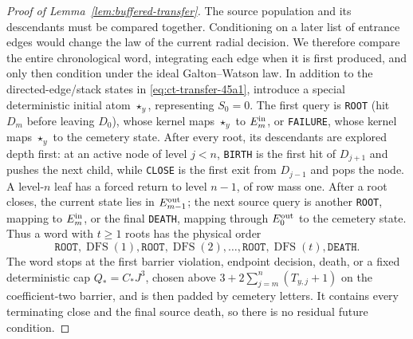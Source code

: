 \begin{proof}[Proof of Lemma~\ref{lem:buffered-transfer}]
The source population and its descendants must be compared together.
Conditioning on a later list of entrance edges would change the law of the
current radial decision.  We therefore compare the entire chronological
word, integrating each edge when it is first produced, and only then
condition under the ideal Galton--Watson law.  In addition to
the directed-edge/stack states in \eqref{eq:ct-transfer-45a1}, introduce a special deterministic
initial atom $\star_y$, representing $S_0=0$.  The first query is
\texttt{ROOT} (hit $D_m$ before leaving $D_0$), whose kernel maps
$\star_y$ to $E_m^{\rm in}$, or \texttt{FAILURE}, whose kernel maps
$\star_y$ to the cemetery state.  After every root, its descendants are
explored depth first: at an active node of level $j<n$, \texttt{BIRTH} is the
first hit of $D_{j+1}$ and pushes the next child, while \texttt{CLOSE} is the
first exit from $D_{j-1}$ and pops the node.  A level-$n$ leaf has a
forced return to level $n-1$, of row mass one.  After a root closes, the
current state lies in $E_{m-1}^{\rm out}$; the next source query is
another \texttt{ROOT}, mapping to $E_m^{\rm in}$, or the final \texttt{DEATH}, mapping
through $E_0^{\rm out}$ to the cemetery state.  Thus a word with
$t\ge1$ roots has the
physical order
\begin{equation}
\mathtt{ROOT},\operatorname{DFS}(1),\mathtt{ROOT},
 \operatorname{DFS}(2),\ldots,\mathtt{ROOT},
 \operatorname{DFS}(t),\mathtt{DEATH}.\label{eq:ct-transfer-45f0}
\end{equation}
The word stops at the first barrier violation, endpoint decision, death,
or a fixed deterministic cap $Q_*=C_*J^3$, chosen above
$3+2\sum_{j=m}^n(T_{y,j}+1)$ on the coefficient-two barrier,
and is then padded by cemetery letters.  It contains every terminating
close and the final source death, so there is no residual future condition.


\end{proof}
